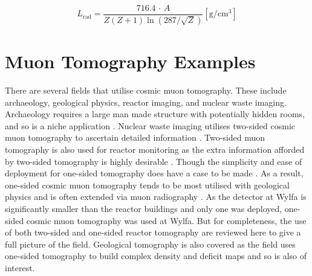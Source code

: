\begin{equation}
    L_\textrm{rad} = \frac{716.4\,\cdot\, A}{Z(Z+1)\ln{(287/\sqrt{Z})}} [\textrm{g}/\textrm{cm}^3]
    \label{equ:lRad}
\end{equation}

\section{Muon Tomography Examples} \label{sec:muTomographyExamples}
There are several fields that utilise cosmic muon tomography. These include archaeology, geological physics, reactor imaging, and nuclear waste imaging. Archaeology requires a large man made structure with potentially hidden rooms, and so is a niche application \cite{Alvarez_Pyramids_1970}. Nuclear waste imaging utilises two-sided cosmic muon tomography to ascertain detailed information \cite{jonkmans2013nuclear}. Two-sided muon tomography is also used for reactor monitoring as the extra information afforded by two-sided tomography is highly desirable \cite{miyadera2013imaging} \cite{perry_imaging_2013} \cite{morris2014analysis}. Though the simplicity and ease of deployment for one-sided tomography does have a case to be made \cite{Erlandson_reactorOST_2018} \cite{Fujii_ReactorRadiography_2019}. As a result, one-sided cosmic muon tomography tends to be most utilised with geological physics and is often extended via muon radiography \cite{Tanaka_mtAsama_2007} \cite{Marteau_2017}. As the detector at Wylfa is significantly smaller than the reactor buildings and only one was deployed, one-sided cosmic muon tomography was used at Wylfa. But for completeness, the use of both two-sided and one-sided reactor tomography are reviewed here to give a full picture of the field. Geological tomography is also covered as the field uses one-sided tomography to build complex density and deficit maps and so is also of interest. 

